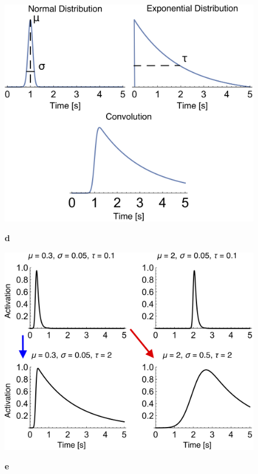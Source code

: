 \documentclass{apa}
\begin{document}
\begin{figure}
\begin{minipage}{0.5\linewidth}
\begin{center}
			\includegraphics[width=.98\linewidth]{figs/alldists.jpg}
		\end{center}
	\end{minipage}
	\begin{minipage}{0.5\linewidth}
		\textbf{d}
		\begin{flushleft}
			\includegraphics[width=.98\linewidth]{figs/allexamples2.jpg}
		\end{flushleft}
	\end{minipage}
	\begin{minipage}{.5\linewidth}
		\textbf{e}
		\begin{flushleft}

\end{flushleft}
\end{minipage}
\end{figure}
\end{document}
